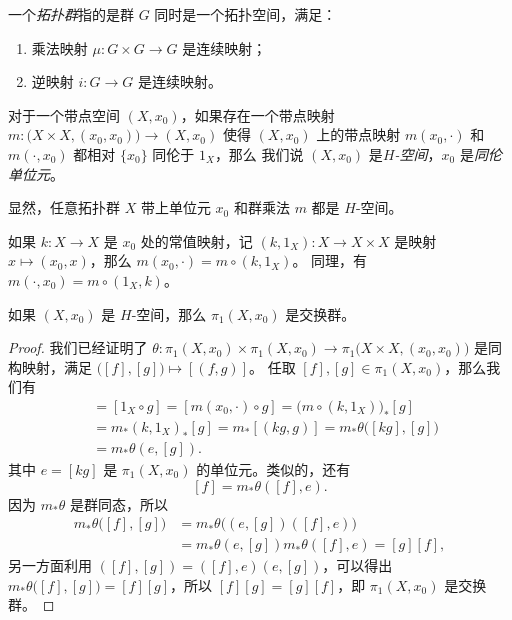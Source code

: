 \documentclass[fontset=none]{Notes}
\begin{document}
\begin{definition}
  一个\emph{拓扑群}指的是群 $G$ 同时是一个拓扑空间，满足：
  \begin{enumerate}
    \item 乘法映射 $\mu:G\times G\to G$ 是连续映射；
    \item 逆映射 $i:G\to G$ 是连续映射。
  \end{enumerate}
\end{definition}

\begin{definition}
  对于一个带点空间 $(X,x_0)$，如果存在一个带点映射
  $m:\bigl(X\times X,(x_0,x_0)\bigr)\to (X,x_0)$ 使得 $(X,x_0)$ 上的带点映射
  $m(x_0,\cdot)$ 和 $m(\cdot,x_0)$ 都相对 $\{x_0\}$ 同伦于 $1_X$，那么
  我们说 $(X,x_0)$ 是\emph{$H$-空间}，$x_0$ 是\emph{同伦单位元}。
\end{definition}

显然，任意拓扑群 $X$ 带上单位元 $x_0$ 和群乘法 $m$ 都是 $H$-空间。

如果 $k:X\to X$ 是 $x_0$ 处的常值映射，记 $(k,1_X):X\to X\times X$
是映射 $x\mapsto (x_0,x)$，那么 $m(x_0,\cdot)=m\circ (k,1_X)$。
同理，有 $m(\cdot,x_0)=m\circ (1_X,k)$。

\begin{theorem}
  如果 $(X,x_0)$ 是 $H$-空间，那么 $\pi_1(X,x_0)$ 是交换群。
\end{theorem}
\begin{proof}
  我们已经证明了 $\theta:\pi_1(X,x_0)\times\pi_1(X,x_0)\to\pi_1\bigl(X\times X,(x_0,x_0)\bigr)$
  是同构映射，满足 $\bigl([f],[g]\bigr)\mapsto [(f,g)]$。
  任取 $[f],[g]\in\pi_1(X,x_0)$，那么我们有
  \begin{align*}
    [g]&=[1_X\circ g]=[m(x_0,\cdot)\circ g]=\bigl(m\circ (k,1_X)\bigr)_*[g]
    \\
    &=m_*(k,1_X)_*[g]=m_*[(kg,g)]=m_*\theta\bigl([kg],[g]\bigr)\\
    &=m_*\theta(e,[g]).
  \end{align*}
  其中 $e=[kg]$ 是 $\pi_1(X,x_0)$ 的单位元。类似的，还有
  \[
    [f]=m_*\theta([f],e).
  \]
  因为 $m_*\theta$ 是群同态，所以
  \begin{align*}
    m_*\theta\bigl([f],[g]\bigr)&=m_*\theta\bigl((e,[g])([f],e)\bigr)\\
    &=m_*\theta(e,[g])m_*\theta([f],e)=[g][f],
  \end{align*}
  另一方面利用 $([f],[g])=([f],e)(e,[g])$，可以得出
  $m_*\theta\bigl([f],[g]\bigr)=[f][g]$，所以
  $[f][g]=[g][f]$，即 $\pi_1(X,x_0)$ 是交换群。
\end{proof}
\end{document}
